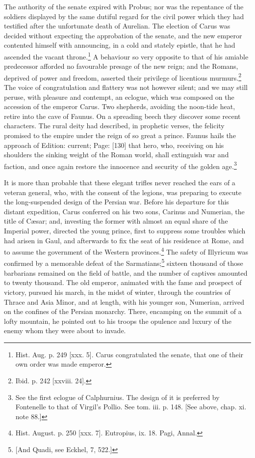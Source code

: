 The authority of the senate expired with Probus; nor was the repentance of the soldiers displayed by the same dutiful regard for the civil power which they had testified after the unfortunate death of Aurelian. The election of Carus was decided without expecting the approbation of the senate, and the new emperor contented himself with announcing, in a cold and stately epistle, that he had ascended the vacant throne.\footnote{Hist. Aug. p. 249 [xxx. 5]. Carus congratulated the senate, that one of their own order was made emperor.} A behaviour so very opposite to that of his amiable predecessor afforded no favourable presage of the new reign; and the Romans, deprived of power and freedom, asserted their privilege of licentious murmurs.\footnote{Ibid. p. 242 [xxviii. 24].} The voice of congratulation and flattery was not however silent; and we may still peruse, with pleasure and contempt, an eclogue, which was composed on the accession of the emperor Carus. Two shepherds, avoiding the noon-tide heat, retire into the cave of Faunus. On a spreading beech they discover some recent characters. The rural deity had described, in prophetic verses, the felicity promised to the empire under the reign of so great a prince. Faunus hails the approach of Edition: current; Page: [130] that hero, who, receiving on his shoulders the sinking weight of the Roman world, shall extinguish war and faction, and once again restore the innocence and security of the golden age.\footnote{See the first eclogue of Calphurnius. The design of it is preferred by Fontenelle to that of Virgil\texthebrew{}’s Pollio. See tom. iii. p. 148. [See above, chap. xi. note 88.]}

It is more than probable that these elegant trifles never reached the ears of a veteran general, who, with the consent of the legions, was preparing to execute the long-suspended design of the Persian war. Before his departure for this distant expedition, Carus conferred on his two sons, Carinus and Numerian, the title of Cæsar; and, investing the former with almost an equal share of the Imperial power, directed the young prince, first to suppress some troubles which had arisen in Gaul, and afterwards to fix the seat of his residence at Rome, and to assume the government of the Western provinces.\footnote{Hist. August. p. 250 [xxx. 7]. Eutropius, ix. 18. Pagi, Annal.} The safety of Illyricum was confirmed by a memorable defeat of the Sarmatians;\footnote{[And Quadi, see Eckhel, 7, 522.]} sixteen thousand of those barbarians remained on the field of battle, and the number of captives amounted to twenty thousand. The old emperor, animated with the fame and prospect of victory, pursued his march, in the midst of winter, through the countries of Thrace and Asia Minor, and at length, with his younger son, Numerian, arrived on the confines of the Persian monarchy. There, encamping on the summit of a lofty mountain, he pointed out to his troops the opulence and luxury of the enemy whom they were about to invade.


